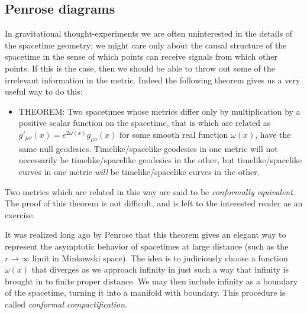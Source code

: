 \documentclass[12pt]{article}
\begin{document}
\subsection{Penrose diagrams}\label{penrosesec}
In gravitational thought-experiments we are often uninterested in the details of the spacetime geometry; we might care only about the causal structure of the spacetime in the sense of which points can receive signals from which other points.  If this is the case, then we should be able to throw out some of the irrelevant information in the metric.  Indeed the following theorem gives us a very useful way to do this:
\begin{itemize}
\item THEOREM: Two spacetimes whose metrics differ only by multiplication by a positive scalar function on the spacetime, that is which are related as $g'_{\mu\nu}(x)=e^{2\omega(x)}g_{\mu\nu}(x)$ for some smooth real function $\omega(x)$, have the same null geodesics.  Timelike/spacelike geodesics in one metric will not necessarily be timelike/spacelike geodesics in the other, but timelike/spacelike curves in one metric \textit{will} be timelike/spacelike curves in the other.
\end{itemize}
Two metrics which are related in this way are said to be \textit{conformally equivalent}.  The proof of this theorem is not difficult, and is left to the interested reader as an exercise.  

It was realized long ago by Penrose that this theorem gives an elegant way to represent the asymptotic behavior of spacetimes at large distance (such as the $r\to \infty$ limit in Minkowski space).  The idea is to judiciously choose a function $\omega(x)$ that diverges as we approach infinity in just such a way that infinity is brought in to finite proper distance.  We may then include infinity as a boundary of the spacetime, turning it into a manifold with boundary.  This procedure is called \textit{conformal compactification}.  
\end{document}
